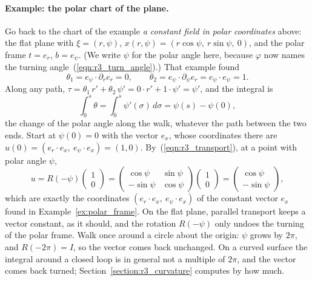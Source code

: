 \paragraph{Example: the polar chart of the plane.} Go back to the chart of the example \emph{a constant field in polar coordinates} above: the flat plane with $\xi = (r, \psi)$, $x(r, \psi) = (r\cos\psi,\ r\sin\psi,\ 0)$, and the polar frame $t = e_r$, $b = e_\psi$. (We write $\psi$ for the polar angle here, because $\varphi$ now names the turning angle~(\ref{eqn:r3_turn_angle}).) That example found
\begin{equation*}
\theta_1 = e_\psi\cdot\partial_r e_r = 0, \qquad \theta_2 = e_\psi\cdot\partial_\psi e_r = e_\psi\cdot e_\psi = 1 .
\end{equation*}
Along any path, $\tau = \theta_1\,r' + \theta_2\,\psi' = 0\cdot r' + 1\cdot\psi' = \psi'$, and the integral is
\begin{equation*}
\int_0^s \theta = \int_0^s \psi'(\sigma)\,d\sigma = \psi(s) - \psi(0) ,
\end{equation*}
the change of the polar angle along the walk, whatever the path between the two ends. Start at $\psi(0) = 0$ with the vector $e_x$, whose coordinates there are $u(0) = (e_r\cdot e_x,\ e_\psi\cdot e_x) = (1, 0)$. By~(\ref{eqn:r3_transport}), at a point with polar angle $\psi$,
\begin{equation*}
u = R(-\psi)\begin{pmatrix} 1 \\ 0 \end{pmatrix} = \begin{pmatrix} \cos\psi & \sin\psi \\ -\sin\psi & \cos\psi \end{pmatrix}\begin{pmatrix} 1 \\ 0 \end{pmatrix} = \begin{pmatrix} \cos\psi \\ -\sin\psi \end{pmatrix} ,
\end{equation*}
which are exactly the coordinates $(e_r\cdot e_x,\ e_\psi\cdot e_x)$ of the constant vector $e_x$ found in Example~\ref{ex:polar_frame}. On the flat plane, parallel transport keeps a vector constant, as it should, and the rotation $R(-\psi)$ only undoes the turning of the polar frame. Walk once around a circle about the origin: $\psi$ grows by $2\pi$, and $R(-2\pi) = I$, so the vector comes back unchanged. On a curved surface the integral around a closed loop is in general not a multiple of $2\pi$, and the vector comes back turned; Section~\ref{section:r3_curvature} computes by how much.

